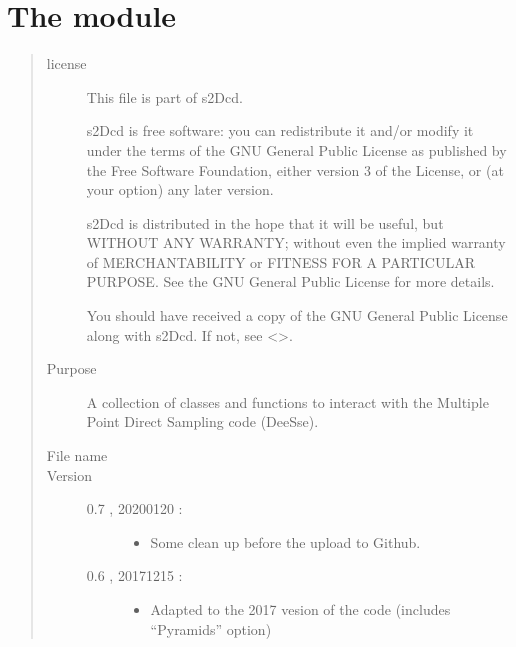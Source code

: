 \documentclass[letterpaper,10pt,english]{sphinxmanual}
\begin{document}
\section{The  module}
\label{\detokenize{appendices:module-s2Dcd.deesse}}\label{\detokenize{appendices:the-s2dcd-deesse-module}}\begin{quote}\begin{description}
\item[{license}] \leavevmode
This file is part of s2Dcd.

s2Dcd is free software: you can redistribute it and/or modify
it under the terms of the GNU General Public License as published by
the Free Software Foundation, either version 3 of the License, or
(at your option) any later version.

s2Dcd is distributed in the hope that it will be useful,
but WITHOUT ANY WARRANTY; without even the implied warranty of
MERCHANTABILITY or FITNESS FOR A PARTICULAR PURPOSE.  See the
GNU General Public License for more details.

You should have received a copy of the GNU General Public License
along with s2Dcd.  If not, see \textless{}\textgreater{}.

\item[{Purpose}] \leavevmode
A collection of classes and functions to interact with the
Multiple Point Direct Sampling code (DeeSse).

\item[{File name}] \leavevmode
{}

\item[{Version}] \leavevmode\begin{description}
\item[{0.7 , 2020\sphinxhyphen{}01\sphinxhyphen{}20 :}] \leavevmode\begin{itemize}
\item {} 
Some clean up before the upload to Github.

\end{itemize}

\item[{0.6 , 2017\sphinxhyphen{}12\sphinxhyphen{}15 :}] \leavevmode\begin{itemize}
\item {} 
Adapted to the 2017 vesion of the code (includes “Pyramids” option)


\end{itemize}
\end{description}
\end{description}
\end{quote}
\end{document}
